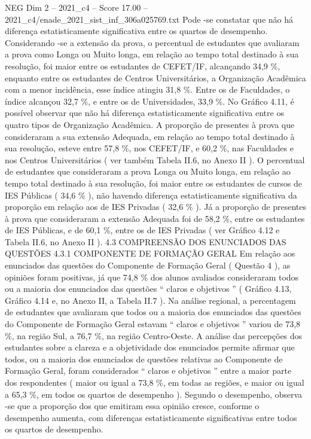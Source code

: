 \begin{textsample}{NEG Dim 2 – 2021\_c4 – Score 17.00 – 2021\_c4/enade\_2021\_sist\_inf\_306a025769.txt}
Pode -se constatar que não há diferença estatisticamente significativa entre os quartos de desempenho.
Considerando -se a extensão da prova, o percentual de estudantes que avaliaram a prova como Longa ou Muito longa, em relação ao tempo total destinado à sua resolução, foi maior entre os estudantes de CEFET/IF, alcançando 34,9 \%, enquanto entre os estudantes de Centros Universitários, a Organização Acadêmica com a menor incidência, esse índice atingiu 31,8 \%.
Entre os de Faculdades, o índice alcançou 32,7 \%, e entre os de Universidades, 33,9 \%.
No Gráfico 4.11, é possível observar que não há diferença estatisticamente significativa entre os quatro tipos de Organização Acadêmica.
A proporção de presentes à prova que consideraram a sua extensão Adequada, em relação ao tempo total destinado à sua resolução, esteve entre 57,8 \%, nos CEFET/IF, e 60,2 \%, nas Faculdades e nos Centros Universitários ( ver também Tabela II.6, no Anexo II ).
O percentual de estudantes que consideraram a prova Longa ou Muito longa, em relação ao tempo total destinado à sua resolução, foi maior entre os estudantes de cursos de IES Públicas ( 34,6 \% ), não havendo diferença estatisticamente significativa da proporção em relação aos de IES Privadas ( 32,6 \% ).
Já a proporção de presentes à prova que consideraram a extensão Adequada foi de 58,2 \%, entre os estudantes de IES Públicas, e de 60,1 \%, entre os de IES Privadas ( ver Gráfico 4.12 e Tabela II.6, no Anexo II ). 4.3 COMPREENSÃO DOS ENUNCIADOS DAS QUESTÕES 4.3.1 COMPONENTE DE FORMAÇÃO GERAL Em relação aos enunciados das questões do Componente de Formação Geral ( Questão 4 ), as opiniões foram positivas, já que 74,8 \% dos alunos avaliados consideraram todos ou a maioria dos enunciados das questões “ claros e objetivos ” ( Gráfico 4.13, Gráfico 4.14 e, no Anexo II, a Tabela II.7 ).
Na análise regional, a percentagem de estudantes que avaliaram que todos ou a maioria dos enunciados das questões do Componente de Formação Geral estavam “ claros e objetivos ” variou de 73,8 \%, na região Sul, a 76,7 \%, na região Centro-Oeste.
A análise das percepções dos estudantes sobre a clareza e a objetividade dos enunciados permite afirmar que todos, ou a maioria dos enunciados de questões relativas ao Componente de Formação Geral, foram considerados “ claros e objetivos ” entre a maior parte dos respondentes ( maior ou igual a 73,8 \%, em todas as regiões, e maior ou igual a 65,3 \%, em todos os quartos de desempenho ).
Segundo o desempenho, observa -se que a proporção dos que emitiram essa opinião cresce, conforme o desempenho aumenta, com diferenças estatisticamente significativas entre todos os quartos de desempenho.

\end{textsample}
